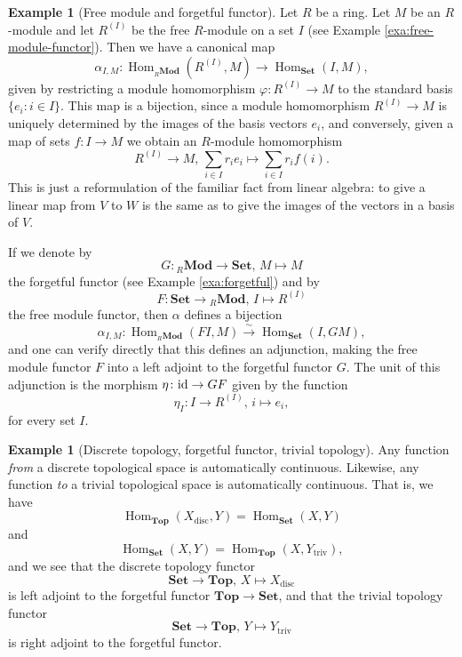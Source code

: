 \documentclass[11pt]{amsbook}
\newcommand{\longisomto}{\overset{\sim}{\longrightarrow}}
\newcommand{\longto}{\longrightarrow}
\DeclareMathOperator\Hom{Hom}
\DeclareMathOperator\Mod{{\bf{Mod}}}
\def\id{{\rm id}}
\def\Set{\mathbf{Set}}
\def\Top{\mathbf{Top}}
\def\Mod{\mathbf{Mod}}
\theoremstyle{plain}
\theoremstyle{definition}
\newtheorem{example}[theorem]{Example}
\begin{document}
\begin{example}[Free module and forgetful functor]\label{exa:free-forgetful-adjunction}
Let $R$ be a ring. Let $M$ be an $R$-module and let $R^{(I)}$ be the free $R$-module on  a set $I$ (see Example \ref{exa:free-module-functor}). Then we have a canonical map
\[
	\alpha_{I,M} \colon \Hom_{{}_R\Mod}( R^{(I)},  M ) \longto \Hom_{\Set}(  I,  M  ),
\]
given by restricting a module homomorphism $\varphi \colon R^{(I)}\to M$ to the standard basis  $\{e_i\colon i\in I\}$. This map is a bijection, since a module homomorphism $R^{(I)} \to M$ is uniquely determined by the images of the basis vectors $e_i$, and conversely, given a map of sets $f\colon I \to M$ we obtain an $R$-module homomorphism
\[
	R^{(I)} \to M,\, \sum_{i\in I} r_i e_i \mapsto \sum_{i \in I} r_i f(i).
\]
This is just a reformulation of the familiar fact from linear algebra: to give a linear map from $V$ to $W$ is the same as to give the images of the vectors in a basis of $V$.

If we denote by
\[
	G\colon {}_R\Mod \to \Set,\, M \mapsto M
\]
the forgetful functor (see Example \ref{exa:forgetful}) and by
\[
	F\colon \Set \to {}_R\Mod,\,I \mapsto R^{(I)}
\] 
the free module functor, then $\alpha$ defines a bijection
\[
	\alpha_{I,M}\colon \Hom_{{}_R\Mod}( FI, M ) \longisomto \Hom_{\Set}( I,  GM ),
\]
and one can verify directly that this defines an adjunction, making the free module functor $F$ into a left adjoint to the forgetful functor $G$. The unit of this adjunction is the morphism $\eta\colon \id \to GF$ given by the function
\[
	\eta_I \colon I \to R^{(I)},\, i \mapsto e_i,
\]
for every set $I$.
\end{example}

\begin{example}[Discrete topology, forgetful functor, trivial topology]\label{exa:discrete-forgetful-trivial}
Any function \emph{from} a discrete topological space is automatically continuous. Likewise, any function \emph{to} a trivial topological space is automatically continuous. That is, we have 
\[
	\Hom_\Top(X_{\mathrm{disc}}, Y ) = \Hom_\Set( X, Y )
\]
and
\[
	\Hom_\Set( X, Y ) = \Hom_\Top( X, Y_{\mathrm{triv}}),
\]
and we see that the discrete topology functor
\[
	\Set \to \Top,\, X\mapsto X_{\mathrm{disc}}
\]
is left adjoint to the forgetful functor $\Top \to \Set$, and that the trivial topology functor
\[
	\Set \to \Top,\, Y \mapsto Y_{\mathrm{triv}}
\]
is right adjoint to the forgetful functor.
\end{example}
\end{document}
